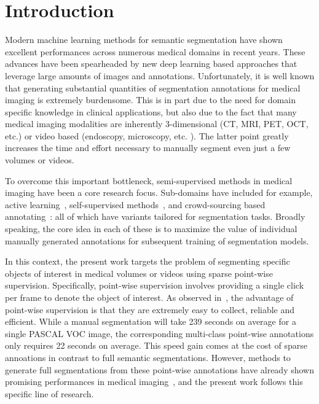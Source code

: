 \section{Introduction}
\label{sec:intro}
Modern machine learning methods for semantic segmentation have shown excellent performances across numerous medical domains in recent years. These advances have been spearheaded by new deep learning based approaches that leverage large amounts of images and annotations. Unfortunately, it is well known that generating substantial quantities of segmentation annotations for medical imaging is extremely burdensome. This is in part due to the need for domain specific knowledge in clinical applications, but also due to the fact that many medical imaging modalities are inherently 3-dimensional (\eg CT, MRI, PET, OCT, etc.) or video based (\eg endoscopy, microscopy, etc. ). The latter point greatly increases the time and effort necessary to manually segment even just a few volumes or videos.

To overcome this important bottleneck, semi-supervised methods in medical imaging have been a core research focus. Sub-domains have included for example, active learning~\cite{sener18, KonSznFua15}, self-supervised methods~\cite{chen19, jamaludin17}, and crowd-sourcing based annotating~\cite{salvador13, heim18}: all of which have variants tailored for segmentation tasks. Broadly speaking, the core idea in each of these is to maximize the value of individual manually generated annotations for subsequent training of segmentation models.

In this context, the present work targets the problem of segmenting specific objects of interest in medical volumes or videos using sparse point-wise supervision. Specifically, point-wise supervision involves providing a single click per frame to denote the object of interest. As observed in~\cite{bearman16}, the advantage of point-wise supervision is that they are extremely easy to collect, reliable and efficient. While a manual segmentation will take 239 seconds on average for a single PASCAL VOC image, the corresponding multi-class point-wise annotations only requires 22 seconds on average. This speed gain comes at the cost of sparse annoations in contrast to full semantic segmentations. However, methods to generate full segmentations from these point-wise annotations have already shown promising performances in medical imaging~\cite{vilarino2007,ferreira12,khosravan16,lejeune17,lejeune18}, and the present work follows this specific line of research. 

